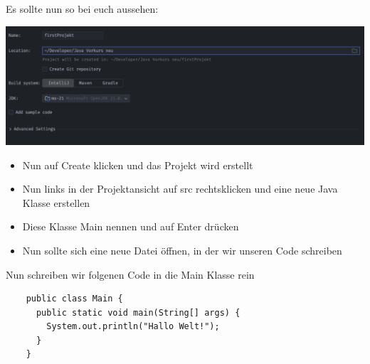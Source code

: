 \documentclass{../sheet}
\begin{document}
Es sollte nun so bei euch aussehen:

  \includegraphics[width=1\linewidth]{img/projektCreation.png}

  \begin{itemize}
    \item Nun auf Create klicken und das Projekt wird erstellt
    \item Nun links in der Projektansicht auf src rechtsklicken und eine neue Java Klasse erstellen
    \item Diese Klasse Main nennen und auf Enter drücken
    \item Nun sollte sich eine neue Datei öffnen, in der wir unseren Code schreiben
  \end{itemize}

  Nun schreiben wir folgenen Code in die Main Klasse rein
  \begin{verbatim}
    public class Main {
      public static void main(String[] args) {
        System.out.println("Hallo Welt!");
      }
    }
  \end{verbatim}
\end{document}
